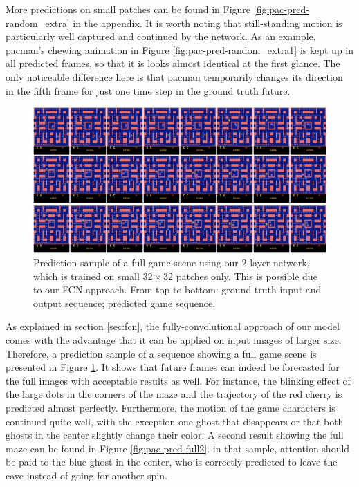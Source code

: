More predictions on small patches can be found in Figure \ref{fig:pac-pred-random_extra} in the appendix. It is worth noting that still-standing motion is particularly well captured and continued by the network. As an example, pacman's chewing animation in Figure \ref{fig:pac-pred-random_extra1} is kept up in all predicted frames, so that it is looks almost identical at the first glance. The only noticeable difference here is that pacman temporarily changes its direction in the fifth frame for just one time step in the ground truth future.

\begin{figure}[htpb]
	\centering
	\includegraphics[width=1.0\linewidth]{figures/pred/pac/full/pred-00.png} 
	\caption[Random Full Screen Prediction Sample on MsPacman]{Prediction sample of a full game scene using our 2-layer network, which is trained on small $32 \times 32$ patches only. This is possible due to our FCN approach. From top to bottom: ground truth input and output sequence; predicted game sequence.} \label{fig:pac-pred-full1}
\end{figure}

As explained in section \ref{sec:fcn}, the fully-convolutional approach of our model comes with the advantage that it can be applied on input images of larger size. Therefore, a prediction sample of a sequence showing a full game scene is presented in Figure \ref{fig:pac-pred-full1}. It shows that future frames can indeed be forecasted for the full images with acceptable results as well. For instance, the blinking effect of the large dots in the corners of the maze and the trajectory of the red cherry is predicted almost perfectly. Furthermore, the motion of the game characters is continued quite well, with the exception one ghost that disappears or that both ghosts in the center slightly change their color. A second result showing the full maze can be found in Figure \ref{fig:pac-pred-full2}. in that sample, attention should be paid to the blue ghost in the center, who is correctly predicted to leave the cave instead of going for another spin.

